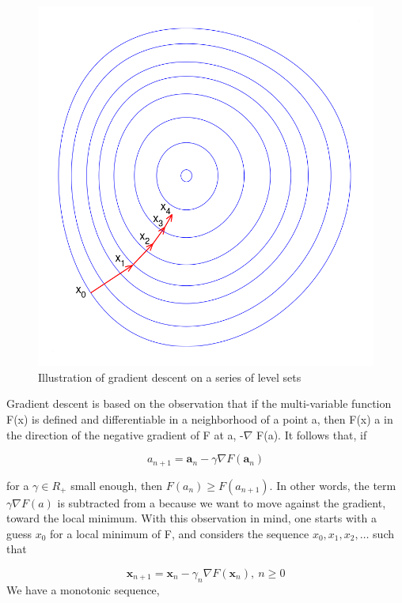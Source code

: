 \documentclass[11pt]{article}
\begin{document}
\subsection*{}
\begin{figure}
\includegraphics[width=0.9\linewidth]{photo/2.png} 
\caption{Illustration of gradient descent on a series of level sets}
\label{fig:wrapfig}
\end{figure}
Gradient descent is based on the observation that if the multi-variable function F(x) is defined and differentiable in a neighborhood of a point a, then F(x) a in the direction of the negative gradient of F at a, -\(\nabla\) F(a). It follows that, if

    \[a_{n + 1}=\mathbf {a} _{n}-\gamma \nabla F(\mathbf {a} _{n})\]

for a \(\gamma \in R_+\) small enough, then \(F(a_{n})\geq F(a_{n+1})\). In other words, the term \( \gamma \nabla F(a)\) is subtracted from a because we want to move against the gradient, toward the local minimum. With this observation in mind, one starts with a guess \( x_0\) for a local minimum of F, and considers the sequence \(  x_0, x_1, x_2,\dots\) such that

    \[ \mathbf {x} _{n+1}=\mathbf {x} _{n}-\gamma _{n}\nabla F(\mathbf {x} _{n}),\ n\geq 0\]
We have a monotonic sequence,
\end{document}
